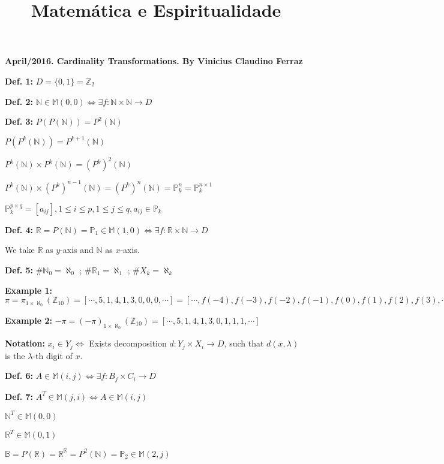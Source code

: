\documentclass[10pt,a4paper]{article}
\title{Matem\'atica e Espiritualidade}
\date{}
\begin{document}
\textbf{April/2016. Cardinality Transformations. By Vinicius Claudino Ferraz}

\vspace{3mm}

\textbf{Def. 1:} $D = \{0, 1 \} = \mathbb{Z}_2$

\textbf{Def. 2:} $\mathbb{N} \in \mathbb{M}(0, 0) \Leftrightarrow \exists f : \mathbb{N} \times \mathbb{N} \rightarrow D$

\textbf{Def. 3:} $P(P(\mathbb{N})) = P^2(\mathbb{N})$

$P(P^{k}(\mathbb{N})) = P^{k+1}(\mathbb{N})$

$P^k(\mathbb{N}) \times P^k(\mathbb{N}) = (P^k)^2 (\mathbb{N})$

$P^k(\mathbb{N}) \times (P^k)^{n-1}(\mathbb{N}) = (P^k)^n (\mathbb{N}) = \mathbb{P}_k^n = \mathbb{P}_k^{n \times 1}$

$\mathbb{P}_k^{p \times q} = [a_{ij}], 1 \le i \le p, 1 \le j \le q, a_{ij} \in \mathbb{P}_k $

\textbf{Def. 4:} $\mathbb{R} = P(\mathbb{N}) = \mathbb{P}_1 \in \mathbb{M}(1, 0) \Leftrightarrow \exists f : \mathbb{R} \times \mathbb{N} \rightarrow D$

We take $\mathbb{R}$ as $y$-axis and $\mathbb{N}$ as $x$-axis.

\textbf{Def. 5:} $\# \mathbb{N}_0 = \aleph_0$ ; $\# \mathbb{R}_1 = \aleph_1$ ; $\# X_k = \aleph_k$

\textbf{Example 1:} $\pi = \pi_{1 \times \aleph_0}(\mathbb{Z}_{10}) = [ \cdots, 5, 1, 4, 1, 3, 0, 0, 0, \cdots ] = [ \cdots, f(-4), f(-3), f(-2), f(-1), f(0), f(1), f(2), f(3), \cdots ] $

\textbf{Example 2:} $-\pi = (-\pi)_{1 \times \aleph_0}(\mathbb{Z}_{10}) = [ \cdots, 5, 1, 4, 1, 3, 0, 1, 1, 1, \cdots ] $

\textbf{Notation:} $x_i \in Y_j \Leftrightarrow $ Exists decomposition $d : Y_j \times X_i \rightarrow D $, such that $d(x, \lambda)$ is the $\lambda$-th digit of $x$.

\textbf{Def. 6:} $A \in \mathbb{M}(i, j) \Leftrightarrow \exists f : B_j \times C_i \rightarrow D$

\textbf{Def. 7:} $A^T \in \mathbb{M}(j, i) \Leftrightarrow A \in \mathbb{M}(i, j)$

$\mathbb{N}^T \in \mathbb{M}(0,0)$

$\mathbb{R}^T \in \mathbb{M}(0,1)$

$\mathbb{B} = P(\mathbb{R}) = \mathbb{R}^\mathbb{R} = P^2(\mathbb{N}) = \mathbb{P}_2 \in \mathbb{M}(2,j)$
\end{document}
